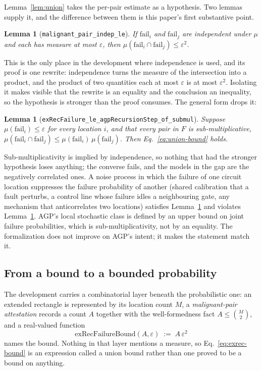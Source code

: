 \documentclass[aps,prx,reprint,nofootinbib,superscriptaddress]{revtex4-2}
\newtheorem{lemma}[theorem]{Lemma}
\begin{document}
Lemma~\ref{lem:union} takes the per-pair estimate as a hypothesis. Two lemmas
supply it, and the difference between them is this paper's first substantive
point.

\begin{lemma}[\texttt{malignant\_pair\_indep\_le}]
\label{lem:indep}
If $\mathrm{fail}_i$ and $\mathrm{fail}_j$ are independent under $\mu$ and each
has measure at most $\varepsilon$, then $\mu(\mathrm{fail}_i \cap
\mathrm{fail}_j) \le \varepsilon^2$.
\end{lemma}

This is the only place in the development where independence is used, and its
proof is one rewrite: independence turns the measure of the intersection into a
product, and the product of two quantities each at most $\varepsilon$ is at most
$\varepsilon^2$. Isolating it makes visible that the rewrite is an equality and
the conclusion an inequality, so the hypothesis is stronger than the proof
consumes. The general form drops it:

\begin{lemma}[\texttt{exRecFailure\_le\_agpRecursionStep\_of\_submul}]
\label{lem:submul}
Suppose $\mu(\mathrm{fail}_i) \le \varepsilon$ for every location $i$, and that
every pair in $F$ is sub-multiplicative, $\mu(\mathrm{fail}_i \cap
\mathrm{fail}_j) \le \mu(\mathrm{fail}_i)\,\mu(\mathrm{fail}_j)$. Then
Eq.~\eqref{eq:union-bound} holds.
\end{lemma}

Sub-multiplicativity is implied by independence, so nothing that had the stronger
hypothesis loses anything; the converse fails, and the models in the gap are the
negatively correlated ones. A noise process in which the failure of one circuit
location suppresses the failure probability of another (shared calibration
that a fault perturbs, a control line whose failure idles a neighbouring gate,
any mechanism that anticorrelates two locations) satisfies
Lemma~\ref{lem:submul} and violates Lemma~\ref{lem:indep}. AGP's local
stochastic class is defined by an upper bound on joint failure probabilities,
which is sub-multiplicativity, not by an equality. The formalization does not
improve on AGP's intent; it makes the statement match it.

\subsection{From a bound to a bounded probability}

The development carries a combinatorial layer beneath the probabilistic one: an
extended rectangle is represented by its location count $M$, a
\emph{malignant-pair attestation} records a count $A$ together with the
well-formedness fact $A \le \binom{M}{2}$, and a real-valued function
\begin{equation}
  \mathrm{exRecFailureBound}(A, \varepsilon) \;:=\; A\,\varepsilon^2
  \label{eq:exrec-bound}
\end{equation}
names the bound. Nothing in that layer mentions a measure, so
Eq.~\eqref{eq:exrec-bound} is an expression called a union bound rather than one
proved to be a bound on anything.
\end{document}
